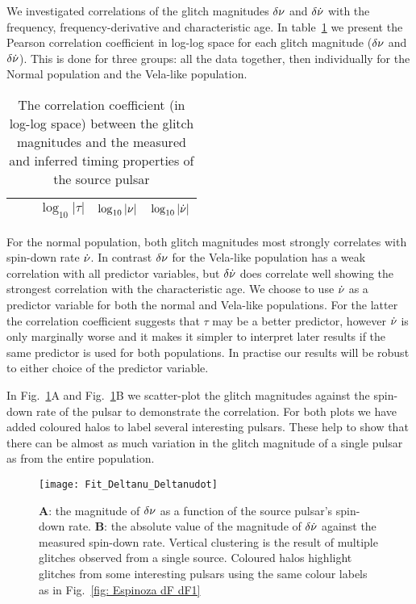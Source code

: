\documentclass[../full_thesis/full_thesis.tex]{subfiles}
\newcommand{\thisdir}{../glitches_in_CGW}
\begin{document}
We investigated correlations of the
glitch magnitudes $\delta\nu$ and $\delta\dot{\nu}$ with the frequency,
frequency-derivative and characteristic age.
In table~\ref{tab: correlation} we present the Pearson correlation coefficient
in log-log space for each glitch magnitude ($\delta\nu$ and $\delta\dot{\nu}$).
This is done for three groups:
all the data together, then individually for the Normal population and the
Vela-like population.
\begin{table}[htb]
\begin{tabular}{l|l|ccc}
&  & $\log_{10}|\tau|$ & $\log_{10}|\nu|$ & $\log_{10}|\dot{\nu}|$ \\\hline

\end{tabular}
\caption{The correlation coefficient (in log-log space) between the glitch
magnitudes and the measured and inferred timing properties of the source pulsar}
\label{tab: correlation}
\end{table}
For the normal population, both glitch magnitudes most strongly correlates with
spin-down rate $\dot{\nu}$. In contrast $\delta\nu$ for the Vela-like population has
a weak correlation with all predictor variables, but $\delta\dot{\nu}$ does
correlate well showing the strongest correlation with the characteristic age.
We choose to use $\dot{\nu}$ as a predictor variable for both the normal and
Vela-like populations. For the latter the correlation coefficient suggests that
$\tau$ may be a better predictor, however $\dot{\nu}$ is only marginally
worse and it makes it simpler to interpret later results if the same predictor is
used for both populations. In practise our results will be robust to either choice
of the predictor variable.

In Fig.~\ref{fig: extrapolation fit}A  and Fig.~\ref{fig: extrapolation fit}B
we scatter-plot
the glitch magnitudes against the spin-down rate of the pulsar to demonstrate the
correlation. For both plots we have added coloured
halos to label several interesting pulsars. These help to show that
there can be almost as much variation in the
glitch magnitude of a single pulsar as from the entire population.
\begin{figure}[htb]
\centering
\texttt{[image: Fit\_Deltanu\_Deltanudot]}
\caption{\textbf{A}: the magnitude of $\delta\nu$ as a function of the source
pulsar's spin-down rate. \textbf{B}: the absolute value of the magnitude of
$\delta\dot{\nu}$ against the measured spin-down rate. Vertical clustering is the
result of multiple glitches observed from a single source. Coloured halos
highlight glitches from some interesting pulsars using the
same colour labels as in Fig.~\ref{fig: Espinoza dF dF1}}
\label{fig: extrapolation fit}
\end{figure}
\end{document}

